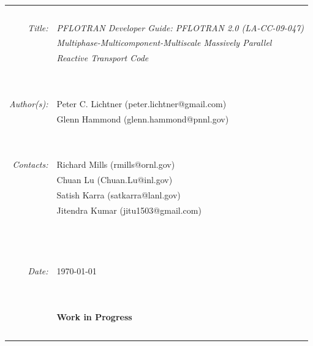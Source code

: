 \documentclass[12pt]{article}
\newcommand{\bc}{\begin{center}}
\newcommand{\ec}{\end{center}}
\begin{document}

\normalsize

\bc
\begin{tabular}{r|l}
~ & ~\\
{\em Title:} & {\sl PFLOTRAN Developer Guide: PFLOTRAN 2.0 (LA-CC-09-047)}\\
~ & {\sl Multiphase-Multicomponent-Multiscale Massively Parallel} \\
~ & {\sl Reactive Transport Code}\\
~ & ~\\
~ & ~\\
{\em Author(s):} & Peter C. Lichtner (peter.lichtner@gmail.com)\\
~  & Glenn Hammond (glenn.hammond@pnnl.gov)\\
~ & ~\\
~ & ~\\
{\em Contacts:}  & Richard Mills (rmills@ornl.gov)\\
~ & Chuan Lu (Chuan.Lu@inl.gov)\\
~ & Satish Karra (satkarra@lanl.gov)\\
~ & Jitendra Kumar (jitu1503@gmail.com)\\
~ & \\%
~ & ~\\
~ & ~\\
{\em Date:} & \today \\
~ & ~\\
~ & ~\\
~ & {\bf \large Work in Progress}\\
~ & ~\\
\end{tabular}
\ec
\end{document}
